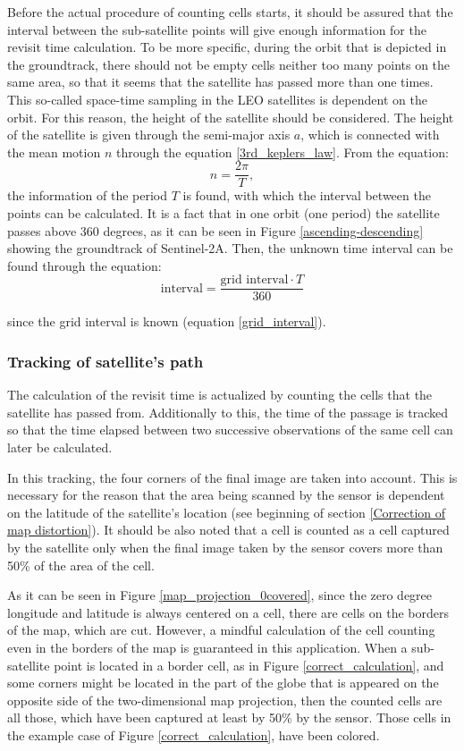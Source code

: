 Before the actual procedure of counting cells starts, it should be assured that the interval between the sub-satellite points will give enough information for the revisit time calculation. To be more specific, during the orbit that is depicted in the groundtrack, there should not be empty cells neither too many points on the same area, so that it seems that the satellite has passed more than one times. This so-called space-time sampling in the LEO satellites is dependent on the orbit. For this reason, the height of the satellite should be considered. The height of the satellite is given through the semi-major axis $a$, which is connected with the mean motion $n$ through the equation \ref{3rd_keplers_law}. From the equation: $$n = \frac{2 \pi}{T}, $$
the information of the period $T$ is found, with which the interval between the points can be calculated. It is a fact that in one orbit (one period) the satellite passes above 360 degrees, as it can be seen in Figure \ref{ascending-descending} showing the groundtrack of Sentinel-2A. Then, the unknown time interval can be found through the equation:
\begin{equation}
\text{interval} = \frac{\text{grid interval} \cdot T}{360}
\end{equation}

since the grid interval is known (equation \ref{grid_interval}).

\bigskip
\subsubsection{Tracking of satellite's path}
\bigskip

The calculation of the revisit time is actualized by counting the cells that the satellite has passed from. Additionally to this, the time of the passage is tracked so that the time elapsed between two successive observations of the same cell can later be calculated. 

In this tracking, the four corners of the final image are taken into account. This is necessary for the reason that the area being scanned by the sensor is dependent on the latitude of the satellite's location (see beginning of section \ref{Correction of map distortion}). It should be also noted that a cell is counted as a cell captured by the satellite only when the final image taken by the sensor covers more than 50\% of the area of the cell.

As it can be seen in Figure \ref{map_projection_0covered}, since the zero degree longitude and latitude is always centered on a cell, there are cells on the borders of the map, which are cut. However, a mindful calculation of the cell counting even in the borders of the map is guaranteed in this application. When a sub-satellite point is located in a border cell, as in Figure \ref{correct_calculation}, and some corners might be located in the part of the globe that is appeared on the opposite side of the two-dimensional map projection, then the counted cells are all those, which have been captured at least by 50\% by the sensor. Those cells in the example case of Figure \ref{correct_calculation}, have been colored.

